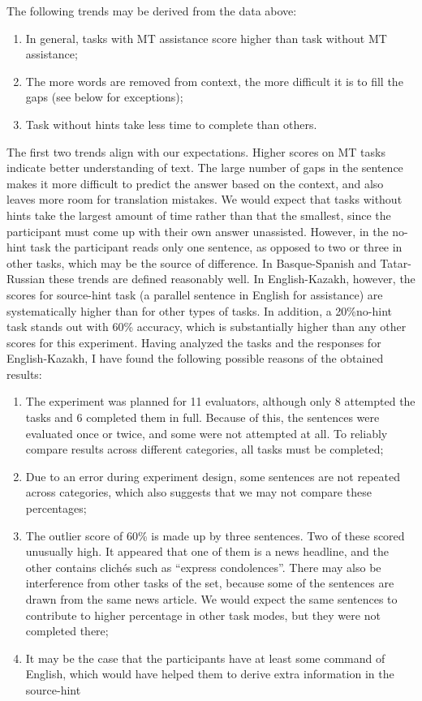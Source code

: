 \documentclass[11pt]{article}
\begin{document}
The following trends may be derived from the data above:
\begin{enumerate}
\item  In general, tasks with MT assistance score higher than task without MT
assistance;
\item  The more words are removed from context, the more difficult it is to fill the gaps
(see below for exceptions);
\item  Task without hints take less time to complete than others.
\end{enumerate}
The first two trends align with our expectations. Higher scores on MT tasks indicate
better understanding of text. The large number of gaps in the sentence makes it more
difficult to predict the answer based on the context, and also leaves more room for
translation mistakes. We would expect that tasks without hints take the largest amount of
time rather than that the smallest, since the participant must come up with their own
answer unassisted. However, in the no-hint task the participant reads only one sentence,
as opposed to two or three in other tasks, which may be the source of difference.
In Basque-Spanish and Tatar-Russian these trends are defined reasonably well. In
English-Kazakh, however, the scores for source-hint task (a parallel sentence in English
for assistance) are systematically higher than for other types of tasks. In addition, a 20\%no-hint task stands out with 60\% accuracy, which is substantially higher than any other
scores for this experiment.
Having analyzed the tasks and the responses for English-Kazakh, I have found the
following possible reasons of the obtained results:
\begin{enumerate}
\item  The experiment was planned for 11 evaluators, although only 8 attempted the
tasks and 6 completed them in full. Because of this, the sentences were evaluated
once or twice, and some were not attempted at all. To reliably compare results
across different categories, all tasks must be completed;
\item  Due to an error during experiment design, some sentences are not repeated across
categories, which also suggests that we may not compare these percentages;
\item  The outlier score of 60\% is made up by three sentences. Two of these scored
unusually high. It appeared that one of them is a news headline, and the other
contains clichés such as “express condolences”. There may also be interference
from other tasks of the set, because some of the sentences are drawn from the
same news article. We would expect the same sentences to contribute to higher
percentage in other task modes, but they were not completed there;
\item  It may be the case that the participants have at least some command of English,
which would have helped them to derive extra information in the source-hint
\end{enumerate}
\end{document}
